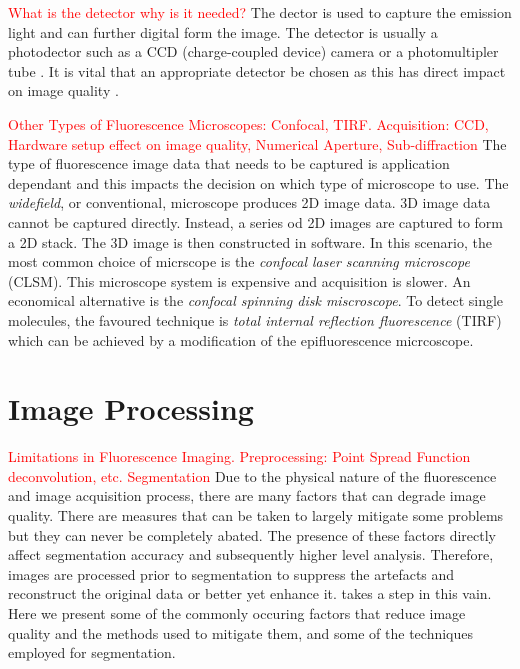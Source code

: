 \begin{definition}[Detector]
	\textcolor{red}{What is the detector why is it needed?}
	The dector is used to capture the emission light and can further digital form the image.
	The detector is usually a photodector such as a CCD (charge-coupled device) camera or a photomultipler tube \citep{Danek2012,Hubeny2008,LichtmanConchello2005,Spring2003,Murphy2001}.
	It is vital that an appropriate detector be chosen as this has direct impact on image quality \citep{Fatima2008}.
\end{definition}

\textcolor{red}{Other Types of Fluorescence Microscopes: Confocal, TIRF. Acquisition: CCD, Hardware setup effect on image quality, Numerical Aperture, Sub-diffraction}
The type of fluorescence image data that needs to be captured is application dependant and this impacts the decision on which type of microscope to use.
The \textit{widefield}, or conventional, microscope produces 2D image data.
3D image data cannot be captured directly.
Instead, a series od 2D images are captured to form a 2D stack. The 3D image is then constructed in software.
In this scenario, the most common choice of micrscope is the \textit{confocal laser scanning microscope} (CLSM).
This microscope system is expensive and acquisition is slower.
An economical alternative is the \textit{confocal spinning disk miscroscope}.
To detect single molecules, the favoured technique is \textit{total internal reflection fluorescence} (TIRF) which can be achieved by a modification of the epifluorescence micrcoscope.


\section{Image Processing}
\label{sec:ImageProcessing}

\textcolor{red}{Limitations in Fluorescence Imaging. Preprocessing: Point Spread Function deconvolution, etc. Segmentation }
Due to the physical nature of the fluorescence and image acquisition process, there are many factors that can degrade image quality.
There are measures that can be taken to largely mitigate some problems but they can never be completely abated.
The presence of these factors directly affect segmentation accuracy and subsequently higher level analysis.
Therefore, images are processed prior to segmentation to suppress the artefacts and reconstruct the original data \citep{Danek2012} or better yet enhance it.
 takes a step in this vain.
Here we present some of the commonly occuring factors that reduce image quality and the methods used to mitigate them, and some of the techniques employed for segmentation.

